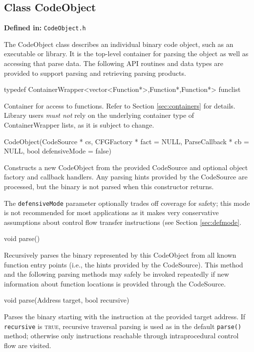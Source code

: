 \documentclass{article}
\newenvironment{apient}{\small\verbatim}{\endverbatim}
\newcommand{\apidesc}[1]{%
{\addtolength{\leftskip}{4em}%
#1\par\medskip}
}
\newcommand{\definedin}[1]{%
\textbf{Defined in:} \texttt{#1}
}
\begin{document}
\subsection{Class CodeObject}

\definedin{CodeObject.h}

The CodeObject class describes an individual binary code object, such as an
executable or library. It is the top-level container for parsing the object as
well as accessing that parse data. The following API routines and data types
are provided to support parsing and retrieving parsing products.

\begin{apient}
typedef ContainerWrapper<vector<Function*>,Function*,Function*> funclist
\end{apient}
\apidesc{Container for access to functions. Refer to Section \ref{sec:containers} for details. Library users \emph{must not} rely on the underlying container type of ContainerWrapper lists, as it is subject to change.}

\begin{apient}
CodeObject(CodeSource * cs,
    CFGFactory * fact = NULL,
    ParseCallback * cb = NULL,
    bool defensiveMode = false)
\end{apient}
\apidesc{Constructs a new CodeObject from the provided CodeSource and
optional object factory and callback handlers. Any parsing hints provided
by the CodeSource are processed, but the binary is not parsed when this
constructor returns.

\medskip\noindent The \texttt{defensiveMode}
parameter optionally trades off coverage for safety; this mode is not
recommended for most applications as it makes very conservative assumptions
about control flow transfer instructions (see Section \ref{sec:defmode}.}

\begin{apient}
void parse()
\end{apient}
\apidesc{Recursively parses the binary represented by this CodeObject from all
known function entry points (i.e., the hints provided by the CodeSource). This
method and the following parsing methods may safely be invoked repeatedly if
new information about function locations is provided through the CodeSource.}

\begin{apient}
void parse(Address target, bool recursive)
\end{apient}
\apidesc{Parses the binary starting with the instruction at the provided target address. If \texttt{recursive} is {\scshape true}, recursive traversal parsing is used as in the default \texttt{parse()} method; otherwise only instructions reachable through intraprocedural control flow are visited.}
\end{document}
